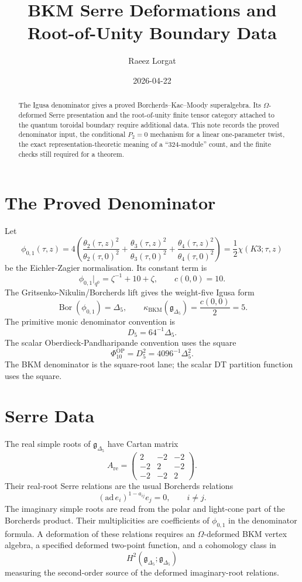 \documentclass[11pt]{article}
\title{BKM Serre Deformations and Root-of-Unity Boundary Data}
\author{Raeez Lorgat}
\date{2026-04-22}
\providecommand{\kBKM}{\kappa_{\mathrm{BKM}}}
\begin{document}
\maketitle

\begin{abstract}
The Igusa denominator gives a proved Borcherds--Kac--Moody
superalgebra.  Its \(\Omega\)-deformed Serre presentation and the
root-of-unity finite tensor category attached to the quantum toroidal
boundary require additional data.  This note records the proved
denominator input, the conditional \(P_2=0\) mechanism for a linear
one-parameter twist, the exact representation-theoretic meaning of a
``\(324\)-module'' count, and the finite checks still required for a
theorem.
\end{abstract}

\tableofcontents

\section{The Proved Denominator}
\label{sec:proved-denominator}

Let
\[
  \phi_{0,1}(\tau,z)
  =
  4\left(
  \frac{\theta_2(\tau,z)^2}{\theta_2(\tau,0)^2}
  +\frac{\theta_3(\tau,z)^2}{\theta_3(\tau,0)^2}
  +\frac{\theta_4(\tau,z)^2}{\theta_4(\tau,0)^2}
  \right)
  =
  \frac{1}{2}\chi(K3;\tau,z)
\]
be the Eichler-Zagier normalisation.  Its constant term is
\[
  \phi_{0,1}\big|_{q^0}=\zeta^{-1}+10+\zeta,\qquad c(0,0)=10 .
\]
The Gritsenko-Nikulin/Borcherds lift gives the weight-five Igusa form
\[
  \operatorname{Bor}(\phi_{0,1})=\Delta_5,\qquad
  \kBKM(\mathfrak g_{\Delta_5})=\frac{c(0,0)}{2}=5 .
\]
The primitive monic denominator convention is
\[
  D_5=64^{-1}\Delta_5 .
\]
The scalar Oberdieck-Pandharipande convention uses the square
\[
  \Phi_{10}^{\mathrm{OP}}=D_5^2=4096^{-1}\Delta_5^2 .
\]
The BKM denominator is the square-root lane; the scalar DT partition
function uses the square.

\section{Serre Data}
\label{sec:serre-data}

The real simple roots of \(\mathfrak g_{\Delta_5}\) have Cartan matrix
\[
  A_{\mathrm{re}}
  =
  \begin{pmatrix}
  2&-2&-2\\
  -2&2&-2\\
  -2&-2&2
  \end{pmatrix}.
\]
Their real-root Serre relations are the usual Borcherds relations
\[
  (\mathrm{ad}\,e_i)^{1-a_{ij}}e_j=0,\qquad i\neq j .
\]
The imaginary simple roots are read from the polar and light-cone part
of the Borcherds product.  Their multiplicities are coefficients of
\(\phi_{0,1}\) in the denominator formula.  A deformation of these
relations requires an \(\Omega\)-deformed BKM vertex algebra, a
specified deformed two-point function, and a cohomology class in
\[
  H^2(\mathfrak g_{\Delta_5};\mathfrak g_{\Delta_5})
\]
measuring the second-order source of the deformed imaginary-root
relations.
\end{document}
